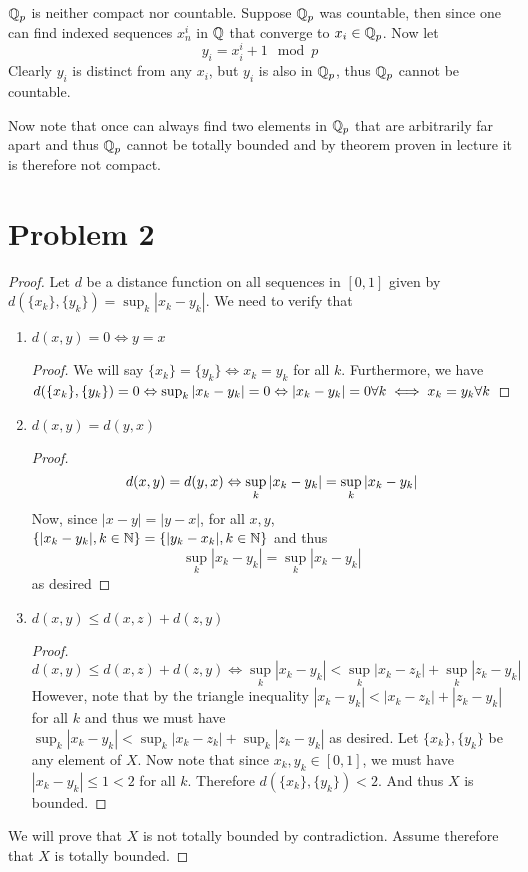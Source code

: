 $\mathbb{Q}_p$ is neither compact nor countable. Suppose $\mathbb{Q}_p$ was countable, then since one can find indexed sequences $x^i_n$ in $\mathbb{Q}$ that converge to $x_i\in \mathbb{Q}_p$. Now let 
\[ y_i = x^i_i + 1 \mod{p} \]
Clearly $y_i$ is distinct from any $x_i$, but $y_i$ is also in $\mathbb{Q}_p$, thus $\mathbb{Q}_p$ cannot be countable. \par
Now note that once can always find two elements in $\mathbb{Q}_p$ that are arbitrarily far apart and thus $\mathbb{Q}_p$ cannot be totally bounded and by theorem proven in lecture it is therefore not compact.
\section*{Problem 2}
\begin{proof}
Let $d$ be a distance function on all sequences in $[0,1]$ given by $d(\{x_k\},\{y_k\})=\sup_k |x_k-y_k|$. 
We need to verify that
\begin{enumerate}
\item $d(x,y)=0\Leftrightarrow y=x$
\begin{proof}
We will say $\{x_k\}=\{y_k\} \Leftrightarrow x_k = y_k$ for all $k$. Furthermore, we have $d(\{x_k\},\{y_k\}) = 0 \Leftrightarrow \sup_k |x_k-y_k| = 0 \Leftrightarrow |x_k-y_k| = 0 \forall k \iff x_k = y_k \forall k$
\end{proof}
\item $d(x,y) = d(y,x)$
\begin{proof}
\[ d(x,y) = d(y,x) \Leftrightarrow \sup_k |x_k-y_k| = \sup_k |x_k-y_k| \]
Now, since $|x-y|=|y-x|$, for all $x,y$, $\{|x_k-y_k|, k\in \mathbb{N}\}=\{|y_k-x_k|, k\in \mathbb{N}\}$ and thus 
\[ \sup_k |x_k-y_k| = \sup_k |x_k-y_k| \]
as desired
\end{proof}
\item $d(x,y) \leq d(x,z) + d(z,y)$
\begin{proof}
\[ d(x,y) \leq d(x,z) + d(z,y) \iff \sup_k |x_k-y_k| < \sup_k |x_k-z_k|  + \sup_k |z_k-y_k| \]
However, note that by the triangle inequality  $|x_k-y_k| < |x_k-z_k|  + |z_k-y_k|$ for all $k$ and thus we must have $\sup_k |x_k-y_k| < \sup_k |x_k-z_k|  + \sup_k |z_k-y_k|$ as desired. 
Let $\{x_k\},\{y_k\}$ be any element of $X$. Now note that since $x_k,y_k \in [0,1]$, we must have $|x_k-y_k|\leq 1 < 2$ for all $k$. Therefore $d(\{x_k\},\{y_k\}) < 2$. And thus $X$ is bounded.  \par
\end{proof}
\end{enumerate}
We will prove that $X$ is not totally bounded by contradiction. Assume therefore that $X$ is totally bounded. 

\end{proof}
